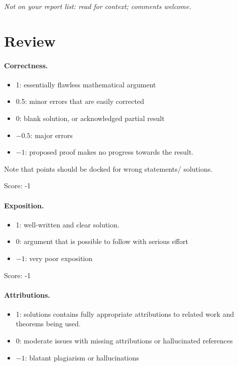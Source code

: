 \documentclass[11pt]{article}
\theoremstyle{definition}
\theoremstyle{remark}
\begin{document}
\maketitle
\noindent\textit{Not on your report list: read for context; comments welcome.}

\section{Review}

\paragraph{Correctness.}
\begin{itemize}
	\item  1: essentially flawless mathematical argument
	\item  0.5: minor errors that are easily corrected
	\item  0: blank solution, or acknowledged partial result
	\item  $-0.5$: major errors
	\item  $-1$: proposed proof makes no progress towards the result.
\end{itemize}
Note that points should be docked for wrong statements/ solutions.

\noindent Score: -1

\paragraph{Exposition.}
\begin{itemize}
	\item  1: well-written and clear solution.
	\item  0: argument that is possible to follow with serious effort
	\item  $-1$: very poor exposition
\end{itemize}

\noindent Score: -1

\paragraph{Attributions.}
\begin{itemize}
	\item  1: solutions contains fully appropriate attributions
		to related work and theorems being used.
	\item  0: moderate issues with missing attributions or hallucinated references
	\item  $-1$: blatant plagiarism or hallucinations
\end{itemize}
\end{document}

